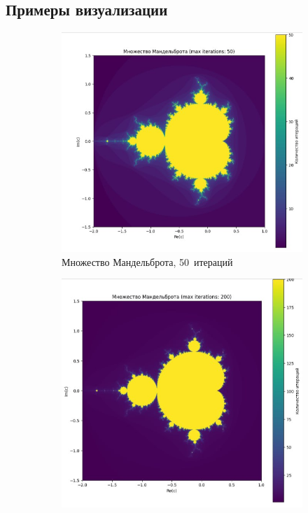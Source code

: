 \subsection{Примеры визуализации}

\begin{figure}[H]
    \captionsetup[subfigure]{labelformat=empty, justification=centering}
    \centering
    \begin{subfigure}{0.4\textwidth}
        \includegraphics[width=\textwidth]{plots/M1.jpg}
        \caption{Множество Мандельброта, 50~итераций}
    \end{subfigure}
    \hspace{1.7cm}
    \begin{subfigure}{0.4\textwidth}
        \includegraphics[width=\textwidth]{plots/M2.jpg}

\end{subfigure}
\end{figure}
